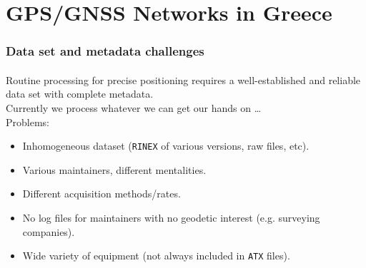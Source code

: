 
\section{GPS/GNSS Networks in Greece}
\begin{frame}\frametitle{Data set and metadata challenges}\framesubtitle{}
\vskip-1.5cm
  Routine processing for precise positioning requires a well-established and reliable data set with complete metadata. \\
  \bigskip
  Currently we process whatever we can get our hands on \ldots\\
  Problems:
  \begin{itemize}
    \item Inhomogeneous dataset (\texttt{RINEX} of various versions, raw files, etc).
    \item Various maintainers, different mentalities.
    \item Different acquisition methods/rates.
    \item No log files for maintainers with no geodetic interest (e.g. surveying companies).
    \item Wide variety of equipment (not always included in \texttt{ATX} files).
  \end{itemize}
\end{frame}
\note

